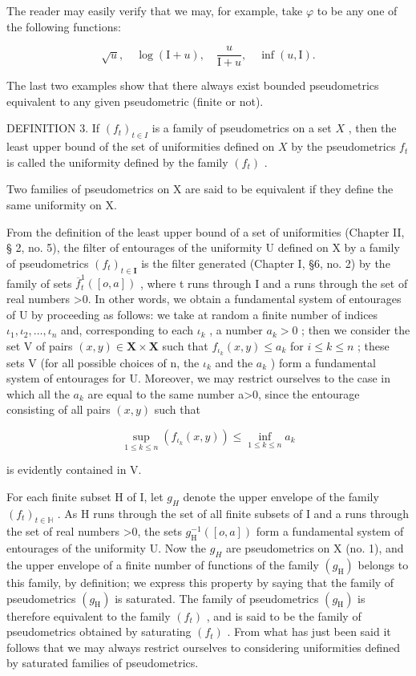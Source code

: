 The reader may easily verify that we may, for example, take \(\varphi\) to be any one of the following functions:

\[
\sqrt {u}, \quad \log (\mathrm{I} + u), \quad \frac {u}{\mathrm{I} + u}, \quad \inf (u, \mathrm{I}).
\]

The last two examples show that there always exist bounded pseudometrics equivalent to any given pseudometric (finite or not).

DEFINITION 3. If \((f_{t})_{t\in I}\) is a family of pseudometrics on a set \(X\) , then the least upper bound of the set of uniformities defined on \(X\) by the pseudometrics \(f_{t}\) is called the uniformity defined by the family \((f_{t})\) .

Two families of pseudometrics on X are said to be equivalent if they define the same uniformity on X.

From the definition of the least upper bound of a set of uniformities (Chapter II, § 2, no. 5), the filter of entourages of the uniformity U defined on X by a family of pseudometrics \((f_{t})_{t\in\mathbf{I}}\) is the filter generated (Chapter I, §6, no. 2) by the family of sets \(\overline{f}_{t}^{1}([o,a])\) , where t runs through I and a runs through the set of real numbers \textgreater0. In other words, we obtain a fundamental system of entourages of U by proceeding as follows: we take at random a finite number of indices \(\iota_{1},\iota_{2},\ldots,\iota_{n}\) and, corresponding to each \(\iota_{k}\) , a number \(a_{k}>0\) ; then we consider the set V of pairs \((x,y)\in\mathbf{X}\times\mathbf{X}\) such that \(f_{\iota_{k}}(x,y)\leqslant a_{k}\) for \(i\leqslant k\leqslant n\) ; these sets V (for all possible choices of n, the \(\iota_{k}\) and the \(a_{k}\) ) form a fundamental system of entourages for U. Moreover, we may restrict ourselves to the case in which all the \(a_{k}\) are equal to the same number a\textgreater0, since the entourage consisting of all pairs \((x,y)\) such that

\[
\sup _ {1 \leqslant k \leqslant n} \left(f _ {\iota_ {k}} (x, y)\right) \leqslant \inf _ {1 \leqslant k \leqslant n} a _ {k}
\]

is evidently contained in V.

For each finite subset H of I, let \(g_{H}\) denote the upper envelope of the family \((f_{t})_{t\in\mathbb{H}}\) . As H runs through the set of all finite subsets of I and a runs through the set of real numbers \textgreater0, the sets \(g_{\mathrm{H}}^{-1}([o,a])\) form a fundamental system of entourages of the uniformity U. Now the \(g_{H}\) are pseudometrics on X (no. 1), and the upper envelope of a finite number of functions of the family \((g_{\mathrm{H}})\) belongs to this family, by definition; we express this property by saying that the family of pseudometrics \((g_{\mathrm{H}})\) is saturated. The family of pseudometrics \((g_{\mathrm{H}})\) is therefore equivalent to the family \((f_{t})\) , and is said to be the family of pseudometrics obtained by saturating \((f_{t})\) . From what has just been said it follows that we may always restrict ourselves to considering uniformities defined by saturated families of pseudometrics.

